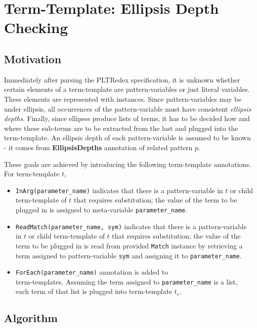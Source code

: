 \section{Term-Template: Ellipsis Depth Checking}

\subsection{Motivation}

Immediately after parsing the PLTRedex specification, it is unknown whether certain elements of a term-template are pattern-variables or just literal variables. These elements are represented with \UnresolvedSymbol \space instances. Since pattern-variables may be under ellipsis, all occurrences of the pattern-variable must have consistent \textit{ellipsis depths}. Finally, since ellipses produce lists of terms, it has to be decided how and where these sub-terms are to be extracted from the last and plugged into the term-template. An ellipsis depth of each pattern-variable is assumed to be known - it comes from \textbf{EllipsisDepths} annotation of related pattern $p$.

These goals are achieved by introducing the following term-template annotations. For term-template $t$,

\begin{itemize}
\item
\texttt{InArg(parameter\_name)} indicates that there is a pattern-variable in $t$ or child term-template of $t$ that requires substitution; the value of the term to be plugged in is assigned to meta-variable \texttt{parameter\_name}.
\item
\texttt{ReadMatch(parameter\_name, sym)} indicates that there is a pattern-variable in $t$ or child term-template of $t$ that requires substitution; the value of the term to be plugged in is read from provided \texttt{Match} instance by retrieving a term assigned to pattern-variable \texttt{sym} and assigning it to \texttt{parameter\_name}.
\item
\texttt{ForEach(parameter\_name)} annotation is added to \TermRepeat \\ term-templates. Assuming the term assigned to \texttt{parameter\_name} is a list, each term of that list is plugged into term-template $t_r$.
\end{itemize}

\subsection{Algorithm}

